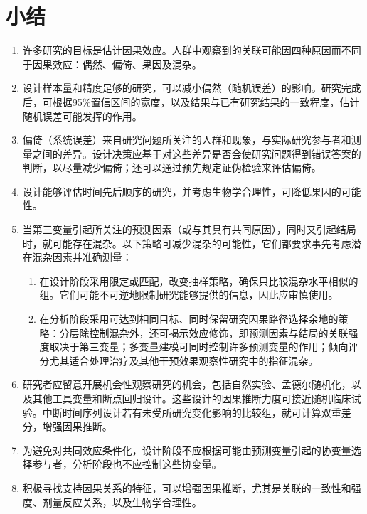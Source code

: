 \section{小结}
\begin{enumerate}
\item 许多研究的目标是估计因果效应。人群中观察到的关联可能因四种原因而不同于因果效应：偶然、偏倚、果因及混杂。
\item 设计样本量和精度足够的研究，可以减小偶然（随机误差）的影响。研究完成后，可根据95\%置信区间的宽度，以及结果与已有研究结果的一致程度，估计随机误差可能发挥的作用。
\item 偏倚（系统误差）来自研究问题所关注的人群和现象，与实际研究参与者和测量之间的差异。设计决策应基于对这些差异是否会使研究问题得到错误答案的判断，以尽量减少偏倚；还可以通过预先规定证伪检验来评估偏倚。
\item 设计能够评估时间先后顺序的研究，并考虑生物学合理性，可降低果因的可能性。
\item 当第三变量引起所关注的预测因素（或与其具有共同原因），同时又引起结局时，就可能存在混杂。以下策略可减少混杂的可能性，它们都要求事先考虑潜在混杂因素并准确测量：
\begin{enumerate}[label=\alph*.]
\item 在设计阶段采用限定或匹配，改变抽样策略，确保只比较混杂水平相似的组。它们可能不可逆地限制研究能够提供的信息，因此应审慎使用。
\item 在分析阶段采用可达到相同目标、同时保留研究因果路径选择余地的策略：分层除控制混杂外，还可揭示效应修饰，即预测因素与结局的关联强度取决于第三变量；多变量建模可同时控制许多预测变量的作用；倾向评分尤其适合处理治疗及其他干预效果观察性研究中的指征混杂。
\end{enumerate}
\item 研究者应留意开展机会性观察研究的机会，包括自然实验、孟德尔随机化，以及其他工具变量和断点回归设计。这些设计的因果推断力度可接近随机临床试验。中断时间序列设计若有未受所研究变化影响的比较组，就可计算双重差分，增强因果推断。
\item 为避免对共同效应条件化，设计阶段不应根据可能由预测变量引起的协变量选择参与者，分析阶段也不应控制这些协变量。
\item 积极寻找支持因果关系的特征，可以增强因果推断，尤其是关联的一致性和强度、剂量反应关系，以及生物学合理性。
\end{enumerate}



\endgroup

